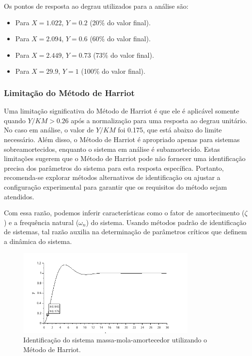 Os pontos de resposta ao degrau utilizados para a análise são:
\begin{itemize}
    \item Para \(X = 1.022\), \(Y = 0.2\) (20\% do valor final).
    \item Para \(X = 2.094\), \(Y = 0.6\) (60\% do valor final).
    \item Para \(X = 2.449\), \(Y = 0.73\) (73\% do valor final).
    \item Para \(X = 29.9\), \(Y = 1\) (100\% do valor final).
\end{itemize}

\subsubsection{Limitação do Método de Harriot}

Uma limitação significativa do Método de Harriot é que ele é aplicável somente quando \(Y/KM > 0.26\) após a normalização para uma resposta ao degrau unitário. No caso em análise, o valor de \(Y/KM\) foi 0.175, que está abaixo do limite necessário. Além disso, o Método de Harriot é apropriado apenas para sistemas sobreamortecidos, enquanto o sistema em análise é subamortecido. Estas limitações sugerem que o Método de Harriot pode não fornecer uma identificação precisa dos parâmetros do sistema para esta resposta específica. Portanto, recomenda-se explorar métodos alternativos de identificação ou ajustar a configuração experimental para garantir que os requisitos do método sejam atendidos.

Com essa razão, podemos inferir características como o fator de amortecimento (\(\zeta\)) e a frequência natural (\(\omega_n\)) do sistema. Usando métodos padrão de identificação de sistemas, tal razão auxilia na determinação de parâmetros críticos que definem a dinâmica do sistema.

\begin{figure}[h]
    \centering
    \includegraphics[width=0.8\textwidth]{atividades/10-atividade/assets/sistema-t73-identificado-nromalizacao-forcada.png}
    \caption{Identificação do sistema massa-mola-amortecedor utilizando o Método de Harriot.}
    \label{fig:sistema-t73-identificado-nromalizacao-forcada}
\end{figure}

